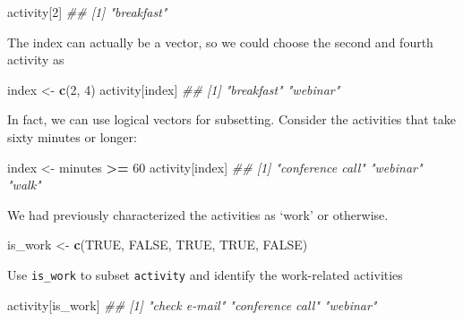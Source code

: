 \documentclass[]{book}
\newenvironment{Shaded}{\begin{snugshade}}{\end{snugshade}}
\newcommand{\CommentTok}[1]{\textcolor[rgb]{0.56,0.35,0.01}{\textit{#1}}}
\newcommand{\DecValTok}[1]{\textcolor[rgb]{0.00,0.00,0.81}{#1}}
\newcommand{\KeywordTok}[1]{\textcolor[rgb]{0.13,0.29,0.53}{\textbf{#1}}}
\newcommand{\NormalTok}[1]{#1}
\newcommand{\OperatorTok}[1]{\textcolor[rgb]{0.81,0.36,0.00}{\textbf{#1}}}
\newcommand{\OtherTok}[1]{\textcolor[rgb]{0.56,0.35,0.01}{#1}}
\newcommand{\StringTok}[1]{\textcolor[rgb]{0.31,0.60,0.02}{#1}}
\begin{document}
\begin{Shaded}
\begin{Highlighting}[]
\NormalTok{activity[}\DecValTok{2}\NormalTok{]}
\CommentTok{## [1] "breakfast"}
\end{Highlighting}
\end{Shaded}

The index can actually be a vector, so we could choose the second and fourth activity as

\begin{Shaded}
\begin{Highlighting}[]
\NormalTok{index <-}\StringTok{ }\KeywordTok{c}\NormalTok{(}\DecValTok{2}\NormalTok{, }\DecValTok{4}\NormalTok{)}
\NormalTok{activity[index]}
\CommentTok{## [1] "breakfast" "webinar"}
\end{Highlighting}
\end{Shaded}

In fact, we can use logical vectors for subsetting. Consider the activities that take sixty minutes or longer:

\begin{Shaded}
\begin{Highlighting}[]
\NormalTok{index <-}\StringTok{ }\NormalTok{minutes }\OperatorTok{>=}\StringTok{ }\DecValTok{60}
\NormalTok{activity[index]}
\CommentTok{## [1] "conference call" "webinar"         "walk"}
\end{Highlighting}
\end{Shaded}

We had previously characterized the activities as `work' or otherwise.

\begin{Shaded}
\begin{Highlighting}[]
\NormalTok{is_work <-}\StringTok{ }\KeywordTok{c}\NormalTok{(}\OtherTok{TRUE}\NormalTok{, }\OtherTok{FALSE}\NormalTok{, }\OtherTok{TRUE}\NormalTok{, }\OtherTok{TRUE}\NormalTok{, }\OtherTok{FALSE}\NormalTok{)}
\end{Highlighting}
\end{Shaded}

Use \texttt{is\_work} to subset \texttt{activity} and identify the work-related activities

\begin{Shaded}
\begin{Highlighting}[]
\NormalTok{activity[is_work]}
\CommentTok{## [1] "check e-mail"    "conference call" "webinar"}
\end{Highlighting}
\end{Shaded}
\end{document}

